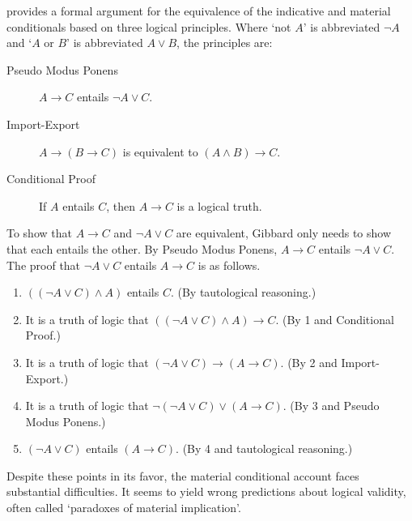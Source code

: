 \citet{Gibbard1981-GIBTRT} provides a formal argument for the equivalence of the indicative and material conditionals based on three logical principles.  Where `not $A$' is abbreviated $\neg A$ and `$A$ or $B$' is abbreviated $A \vee B$, the principles are:
\begin{description}
\item[Pseudo Modus Ponens] $A \rightarrow C$ entails $\neg A \vee C$.
\item[Import-Export] $A \rightarrow (B \rightarrow C)$ is equivalent to $(A \wedge B) \rightarrow C$.
\item[Conditional Proof] If $A$ entails $C$, then $A \rightarrow C$ is a logical truth.
\end{description}
To show that $A \rightarrow C$ and $\neg A \vee C$ are equivalent, Gibbard only needs to show that each entails the other.  By Pseudo Modus Ponens, $A \rightarrow C$ entails $\neg A \vee C$.  The proof that $\neg A  \vee C$ entails $A \rightarrow C$ is as follows.
\begin{enumerate}
\item $((\neg A \vee C) \wedge A)$ entails $C$. (By tautological reasoning.)
\item It is a truth of logic that $((\neg A \vee C) \wedge A) \rightarrow C$. (By 1 and Conditional Proof.)
\item It is a truth of logic that $(\neg A \vee C) \rightarrow (A \rightarrow C)$. (By 2 and Import-Export.)
\item It is a truth of logic that $\neg (\neg A \vee C) \vee (A \rightarrow C)$. (By 3 and Pseudo Modus Ponens.)
\item $(\neg A \vee C)$ entails $(A \rightarrow C)$. (By 4 and tautological reasoning.)
\end{enumerate}

Despite these points in its favor, the material conditional account faces substantial difficulties.  It seems to yield wrong predictions about logical validity, often called `paradoxes of material implication'.

